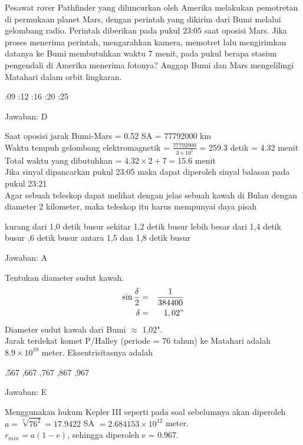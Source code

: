 \documentclass[11pt,fleqn]{exam}
\begin{document}
\begin{questions}
\question Pesawat rover Pathfinder yang diluncurkan oleh Amerika melakukan pemotretan di permukaan planet Mars, dengan perintah yang dikirim dari Bumi melalui gelombang radio. Perintah diberikan pada pukul 23:05 saat oposisi Mars. Jika proses menerima perintah, mengarahkan kamera, memotret lalu mengirimkan datanya ke Bumi membutuhkan waktu 7 menit, pada pukul berapa stasiun pengendali di Amerika menerima fotonya? Anggap Bumi dan Mars mengelilingi Matahari dalam orbit lingkaran.
\begin{choices}
:09
:12
:16
:20
:25
\end{choices}

Jawaban: D

Saat oposisi jarak Bumi-Mars = 0.52 SA = 77792000 km\\
Waktu tempuh gelombang elektromagnetik = $\frac{77792000}{3\times 10^5}$ = 259.3 detik = 4.32 menit\\
Total waktu yang dibutuhkan = $4.32 \times 2 + 7 = 15.6$ menit\\
Jika sinyal dipancarkan pukul 23:05 maka dapat diperoleh sinyal balasan pada pukul 23:21\\


\question Agar sebuah teleskop dapat melihat dengan jelas sebuah kawah di Bulan dengan diameter 2 kilometer, maka teleskop itu harus mempunyai daya pisah
\begin{choices}
\choice kurang dari 1,0 detik busur
\choice sekitar 1,2 detik busur
\choice lebih besar dari 1,4 detik busur
,6 detik busur
\choice antara 1,5 dan 1,8 detik busur
\end{choices}

Jawaban: A

Tentukan diameter sudut kawah.
\begin{eqnarray*}
\sin \frac{\delta}{2}&=&\dfrac{1}{384400}\\
\delta &=&1,02"
\end{eqnarray*}
Diameter sudut kawah dari Bumi $\approx$ 1,02".\\


\question Jarak terdekat komet P/Halley (periode = 76 tahun) ke Matahari adalah $8.9 \times 10^{10}$ meter. Eksentrisitasnya adalah 
\begin{choices}
,567
,667
,767
,867
,967
\end{choices}

Jawaban: E

Menggunakan hukum Kepler III seperti pada soal sebelumnya akan diperoleh $a = \sqrt[3]{76^2} = 17.9422$ SA $= 2.684153 \times 10^{12}$ meter.\\
$r_{min} = a(1-e)$, sehingga diperoleh e = 0.967.\\



\end{questions}
\end{document}
